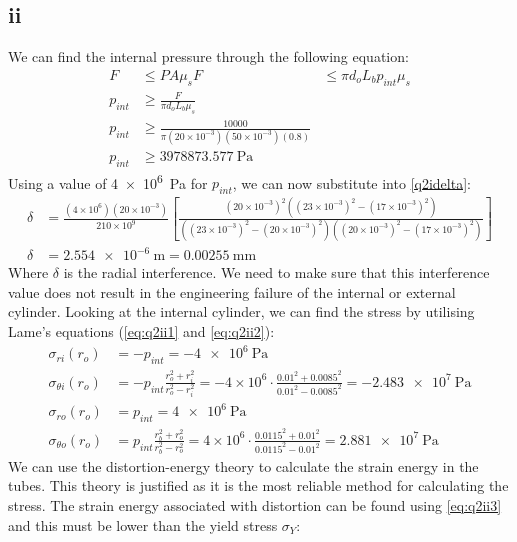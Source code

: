 \documentclass[11pt]{article}
\numberwithin{equation}{section}
\begin{document}
\subsection{ii}
We can find the internal pressure through the following equation:
\begin{align}
    F &\leq PA\mu_s
    F &\leq \pi d_o L_b p_{int} \mu_s\\
    p_{int} &\geq \frac{F}{\pi d_o L_b \mu_s}\\
    p_{int} &\geq \frac{10000}{\pi (20\times 10^{-3})(50\times 10^{-3})(0.8)}\\
    p_{int} &\geq \SI{3978873.577}{\pascal}
\end{align}
Using a value of \SI{4e6}{\pascal} for $p_{int}$, we can now substitute into \ref{q2idelta}:
\begin{align}
    \delta &= \frac{(4\times 10^{6})(20\times 10^{-3})}{210\times 10^9}\left[\frac{(20\times 10^{-3})^2\left((23\times 10^{-3})^2-(17\times 10^{-3})^2\right)}{\left((23\times 10^{-3})^2 - (20\times 10^{-3})^2\right)\left((20\times 10^{-3})^2-(17\times 10^{-3})^2\right)}\right]\\
    \delta &= \SI{2.554e-6}{\meter} = \SI{0.00255}{\milli\meter}
\end{align}
Where $\delta$ is the radial interference. We need to make sure that this interference value does not result in the engineering failure of the internal or external cylinder. Looking at the internal cylinder, we can find the stress by utilising Lame's equations (\ref{eq:q2ii1} and \ref{eq:q2ii2}):
\begin{align}
    \sigma_{ri} \left(r_o\right) &= -p_{int} = \SI{-4e6}{\pascal}\\
    \sigma_{\theta i} \left(r_o\right) &= -p_{int}\frac{r_o^2 + r_i^2}{r_o^2 - r_i^2} = -4\times 10^6 \cdot \frac{0.01^2 + 0.0085^2}{0.01^2 - 0.0085^2} = \SI{-2.483e7}{\pascal}\\
    \sigma_{ro} \left(r_o\right) &= p_{int} = \SI{4e6}{\pascal}\\
    \sigma_{\theta o} \left(r_o\right) &= p_{int}\frac{r_b^2 + r_o^2}{r_b^2 -r_o^2} = 4\times 10^6 \cdot \frac{0.0115^2 + 0.01^2}{0.0115^2 -0.01^2} = \SI{2.881e7}{\pascal}
\end{align}
We can use the distortion-energy theory to calculate the strain energy in the tubes. This theory is justified as it is the most reliable method for calculating the stress. The strain energy associated with distortion can be found using \ref{eq:q2ii3} and this must be lower than the yield stress $\sigma_Y$:
\end{document}
